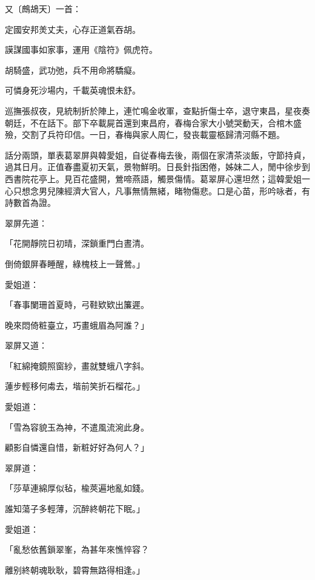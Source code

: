 又〔鷓鴣天〕一首：
\begin{myquote}
定國安邦羙丈夫，心存正道氣吞胡。

謨謀國事如家事，運用《陰符》佩虎符。

胡騎盛，武功弛，兵不用命將驕癡。

可憐身死沙場内，千載英魂恨未舒。
\end{myquote}

巡撫張叔夜，見統制折於陣上，連忙鳴金收軍，查點折傷士卒，退守東昌，星夜奏朝廷，不在話下。部下卒載屍首還到東昌府，春梅合家大小號哭動天，合棺木盛殮，交割了兵符印信。一日，春梅與家人周仁，發丧載靈柩歸清河縣不題。

話分兩頭，單表葛翠屏與韓愛姐，自従春梅去後，兩個在家清茶淡飯，守節持貞，過其日月。正值春盡夏初天氣，景物鮮明。日長針指困倦，姊妹二人，閒中徐步到西書院花亭上。見百花盛開，鶯啼燕語，觸景傷情。葛翠屏心還坦然；這韓愛姐一心只想念男兒陳經濟大官人，凡事無情無緒，睹物傷悲。口是心苗，形吟咏者，有詩數首為證。

翠屏先道：
\begin{myquote}
「花開靜院日初晴，深鎖重門白晝清。

倒倚銀屏春睡醒，綠槐枝上一聲鶯。」
\end{myquote}

愛姐道：
\begin{myquote}
「春事闌珊首夏時，弓鞋欵欵出簾遲。

晚來悶倚粧臺立，巧畫蛾眉為阿誰？」
\end{myquote}

翠屏又道：
\begin{myquote}
「紅綿掩鏡照窗紗，畫就雙蛾八字斜。

蓮步輕移何䖏去，堦前笑折石榴花。」
\end{myquote}

愛姐道：
\begin{myquote}
「雪為容貌玉為神，不遣風流涴此身。

顧影自憐還自惜，新粧好好為何人？」
\end{myquote}

翠屏道：
\begin{myquote}
「莎草連綿厚似毡，楡莢遍地亂如錢。

誰知蕩子多輕薄，沉醉終朝花下眠。」
\end{myquote}

愛姐道：
\begin{myquote}
「亂愁依舊鎖翠峯，為甚年來憔悴容？

離别終朝魂耿耿，碧霄無路得相逢。」
\end{myquote}

